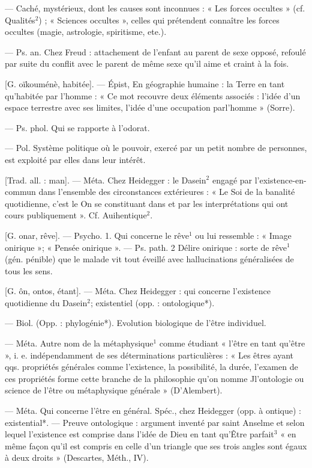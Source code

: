 \begin{itemize}[leftmargin=1cm, label=, itemsep=1pt]
 — Caché, mystérieux, dont
les causes sont inconnues : « Les
forces occultes » (cf. Qualités$^2$) ;
« Sciences occultes », celles qui prétendent connaître les forces occultes
(magie, astrologie, spiritisme, ete.).

 — Ps. an. Chez
Freud : attachement de l’enfant au
parent de sexe opposé, refoulé par
suite du conflit avec le parent de
même sexe qu'il aime et craint à la
fois.

 [G. oïkouménè, habitée].
— Épist, En géographie humaine :
la Terre en tant qu'habitée par
l’homme : « Ce mot recouvre deux
éléments associés : l’idée d’un
espace terrestre avec ses limites,
l’idée d’une occupation parl’homme »
(Sorre).

 — Ps. phol. Qui se rapporte
à l’odorat.

 — Pol. Système politique
où le pouvoir, exercé par un petit
nombre de personnes, est exploité
par elles dans leur intérêt.

 [Trad. all. : man]. — Méta. Chez
Heidegger : le Dasein$^2$ engagé par
l’existence-en-commun dans l’ensemble des circonstances extérieures :
« Le Soi de la banalité quotidienne,
c’est le On se constituant dans et
par les interprétations qui ont
cours publiquement ». Cf. Auihentique$^2$.

 [G. onar, rêve]. — Psycho.
1. Qui concerne le rêve$^1$ ou lui ressemble : « Image onirique »; « Pensée
onirique ». — Ps. path. 2 Délire
onirique : sorte de rêve$^1$ (gén. pénible) que le malade vit tout éveillé
avec hallucinations généralisées de
tous les sens.

 [G. ôn, ontos, étant]. — Méta.
Chez Heidegger : qui concerne l’existence quotidienne du Dasein$^2$; existentiel (opp. : ontologique*).

 — Biol. (Opp. : phylogénie*). Evolution biologique de
l’être individuel.

 — Méta. Autre nom de la
métaphysique$^1$ comme étudiant
« l'être en tant qu'être », i. e. indépendamment de ses déterminations
particulières : « Les êtres ayant qqs.
propriétés générales comme l’existence,
la possibilité, la durée, l’examen de ces propriétés forme cette
branche de la philosophie qu’on
nomme Jl’ontologie ou science de
l'être ou métaphysique générale »
(D’Alembert).

 — Méta. Qui concerne
l'être en général. Spéc., chez Heidegger (opp. à ontique) : existential*. — Preuve ontologique : argument inventé par saint Anselme
et selon lequel l’existence est comprise dans l'idée de Dieu en tant
qu'Être parfait$^3$ « en même façon
qu'il est compris en celle d’un
triangle que ses trois angles sont
égaux à deux droits » (Descartes,
Méth., IV).


\end{itemize}
